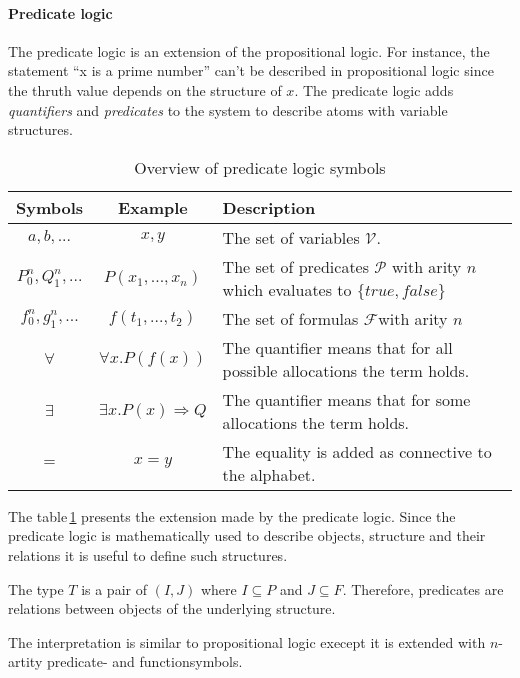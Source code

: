 \paragraph{Predicate logic}
The predicate logic is an extension of the propositional logic.
For instance, the statement ``x is a prime number'' can't be described
in propositional logic since the thruth value depends on the structure of $x$.
The predicate logic adds \textit{quantifiers} and \textit{predicates} to the
system to describe atoms with variable structures.~\cite{heinemann2013logik}

\begin{table}[h]
  \centering
  \begin{tabular}{c|c|l}
    Symbols & Example & Description\\\hline
    $a,b,...$ & $x,y$ & The set of variables $\mathcal{V}$.\\
    $P_0^n,Q_1^n,...$ & $P(x_1,...,x_n)$ & The set of predicates $\mathcal{P}$ with arity $n$
                                          which evaluates to $\{true,false\}$\\
    $f_0^n,g_1^n,...$ & $f(t_1,...,t_2)$ & The set of formulas $\mathcal{F}$with arity $n$\\
    $\forall$ & $\forall x.P(f(x))$ & The quantifier means that for all possible allocations the term holds.\\
    $\exists$ & $\exists x.P(x)\Rightarrow Q$ & The quantifier means that for some allocations the term holds.\\
    $=$ & $x = y$ & The equality is added as connective to the alphabet.\\
  \end{tabular}
  \caption{Overview of predicate logic symbols}
  \label{tab:predlogic}
\end{table}

The table\,\ref{tab:predlogic} presents the extension made by the predicate logic.
Since the predicate logic is mathematically used to describe objects,
structure and their relations it is useful to define such structures.~\cite{heinemann2013logik}

\begin{defi}
  The type $T$ is a pair of $(I,J)$ where $I\subseteq P$ and $J\subseteq F$.
  Therefore, predicates are relations between objects of the underlying
  structure.
\end{defi}

The interpretation is similar to propositional logic execept it is
extended with $n$-artity predicate- and functionsymbols.~\cite{heinemann2013logik}

